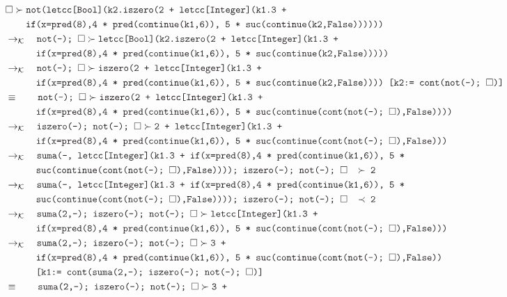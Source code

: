 \documentclass{article}
\newcommand{\tx}[1]{\textcolor{Black} {\texttt{#1}}}
\newcommand{\es}{$\square$}
\newcommand{\pop}[2]{ \tx{#1} \succ \tx{#2}}
\newcommand{\kr}{\rightarrow_{\mathcal{K}} \quad}
\begin{document}
\begin{enumerate}
\begin{enumerate}
			\begin{align*}
			&\pop{\es}{not(letcc[Bool](k2.iszero(2 + letcc[Integer](k1.3 +} \\
			&\tx{\quad \quad  if(x=pred(8),4 * pred(continue(k1,6)), 5 * suc(continue(k2,False))))))}\\
			&\kr \pop{not(-); \es}{letcc[Bool](k2.iszero(2 + letcc[Integer](k1.3 +} \\
			&\tx{\quad \quad \quad if(x=pred(8),4 * pred(continue(k1,6)), 5 * suc(continue(k2,False)))))}\\
			&\kr \pop{not(-); \es}{iszero(2 + letcc[Integer](k1.3 +} \\
			&\tx{\quad \quad \quad if(x=pred(8),4 * pred(continue(k1,6)), 5 * suc(continue(k2,False)))) [k2:= cont(not(-); \es)]}\\
			&\equiv \quad \quad \pop{not(-); \es}{iszero(2 + letcc[Integer](k1.3 +} \\
			&\tx{\quad \quad \quad if(x=pred(8),4 * pred(continue(k1,6)), 5 * suc(continue(cont(not(-); \es),False))))}\\					
			&\kr \pop{iszero(-); not(-); \es}{2 + letcc[Integer](k1.3 +} \\
			&\tx{\quad \quad \quad if(x=pred(8),4 * pred(continue(k1,6)), 5 * suc(continue(cont(not(-); \es),False)))}\\
			&\kr \tx{suma(-, letcc[Integer](k1.3 + if(x=pred(8),4 * pred(continue(k1,6)), 5 *}\\ &\tx{\quad \quad \quad suc(continue(cont(not(-); \es),False)))); iszero(-); not(-); \es $\quad \succ$ 2}\\
			&\kr \tx{suma(-, letcc[Integer](k1.3 + if(x=pred(8),4 * pred(continue(k1,6)), 5 *}\\ &\tx{\quad \quad \quad suc(continue(cont(not(-); \es),False)))); iszero(-); not(-); \es $\quad \prec$ 2}\\
			&\kr \pop{suma(2,-); iszero(-); not(-); \es}{letcc[Integer](k1.3 +}\\
			&\tx{\quad \quad \quad if(x=pred(8),4 * pred(continue(k1,6)), 5 * suc(continue(cont(not(-); \es),False)))}\\
			&\kr \pop{suma(2,-); iszero(-); not(-); \es}{3 +}\\
			&\tx{\quad \quad \quad if(x=pred(8),4 * pred(continue(k1,6)), 5 * suc(continue(cont(not(-); \es),False))}\\
			&\tx{\quad \quad \quad [k1:= cont(suma(2,-); iszero(-); not(-); \es)]}\\
			& \equiv \quad \quad \pop{suma(2,-); iszero(-); not(-); \es}{3 +}\\

\end{align*}
\end{enumerate}
\end{enumerate}
\end{document}
